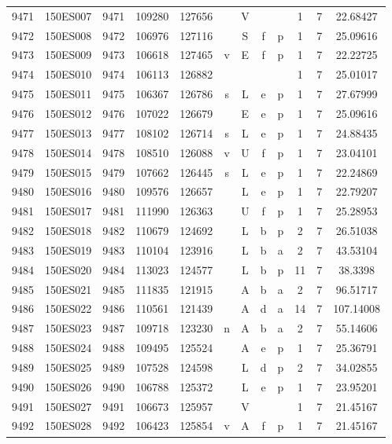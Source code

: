 \begin{tabular}{|*{12}{c|}}
9471 & 150ES007 & 9471 & 109280 & 127656 &  & V &  &  & 1 & 7 & 22.68427 \\ 
9472 & 150ES008 & 9472 & 106976 & 127116 &  & S & f & p & 1 & 7 & 25.09616 \\ 
9473 & 150ES009 & 9473 & 106618 & 127465 & v & E & f & p & 1 & 7 & 22.22725 \\ 
9474 & 150ES010 & 9474 & 106113 & 126882 &  &  &  &  & 1 & 7 & 25.01017 \\ 
9475 & 150ES011 & 9475 & 106367 & 126786 & s & L & e & p & 1 & 7 & 27.67999 \\ 
9476 & 150ES012 & 9476 & 107022 & 126679 &  & E & e & p & 1 & 7 & 25.09616 \\ 
9477 & 150ES013 & 9477 & 108102 & 126714 & s & L & e & p & 1 & 7 & 24.88435 \\ 
9478 & 150ES014 & 9478 & 108510 & 126088 & v & U & f & p & 1 & 7 & 23.04101 \\ 
9479 & 150ES015 & 9479 & 107662 & 126445 & s & L & e & p & 1 & 7 & 22.24869 \\ 
9480 & 150ES016 & 9480 & 109576 & 126657 &  & L & e & p & 1 & 7 & 22.79207 \\ 
9481 & 150ES017 & 9481 & 111990 & 126363 &  & U & f & p & 1 & 7 & 25.28953 \\ 
9482 & 150ES018 & 9482 & 110679 & 124692 &  & L & b & p & 2 & 7 & 26.51038 \\ 
9483 & 150ES019 & 9483 & 110104 & 123916 &  & L & b & a & 2 & 7 & 43.53104 \\ 
9484 & 150ES020 & 9484 & 113023 & 124577 &  & L & b & p & 11 & 7 & 38.3398 \\ 
9485 & 150ES021 & 9485 & 111835 & 121915 &  & A & b & a & 2 & 7 & 96.51717 \\ 
9486 & 150ES022 & 9486 & 110561 & 121439 &  & A & d & a & 14 & 7 & 107.14008 \\ 
9487 & 150ES023 & 9487 & 109718 & 123230 & n & A & b & a & 2 & 7 & 55.14606 \\ 
9488 & 150ES024 & 9488 & 109495 & 125524 &  & A & e & p & 1 & 7 & 25.36791 \\ 
9489 & 150ES025 & 9489 & 107528 & 124598 &  & L & d & p & 2 & 7 & 34.02855 \\ 
9490 & 150ES026 & 9490 & 106788 & 125372 &  & L & e & p & 1 & 7 & 23.95201 \\ 
9491 & 150ES027 & 9491 & 106673 & 125957 &  & V &  &  & 1 & 7 & 21.45167 \\ 
9492 & 150ES028 & 9492 & 106423 & 125854 & v & A & f & p & 1 & 7 & 21.45167 \\ 

\end{tabular}
